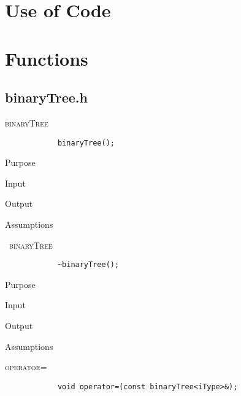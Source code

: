 \documentclass[pdftex, 12pt]{article}
\begin{document}
\section{Use of Code}

\section{Functions}

\subsection{binaryTree.h}
\begin{description}

	\item{\textsc{binaryTree}}
		\begin{lstlisting}
			binaryTree();
		\end{lstlisting}
		\begin{description}

			\item{Purpose}

			\item{Input}

			\item{Output}

			\item{Assumptions}

		\end{description}
	\item{\textsc{~binaryTree}}
		\begin{lstlisting}
			~binaryTree();
		\end{lstlisting}
		\begin{description}

			\item{Purpose}

			\item{Input}

			\item{Output}

			\item{Assumptions}

		\end{description}
	\item{\textsc{operator=}}
		\begin{lstlisting}
			void operator=(const binaryTree<iType>&);
		\end{lstlisting}


\end{description}
\end{document}
